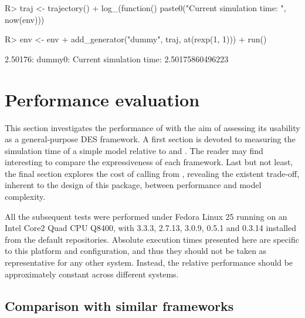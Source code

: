 \documentclass[
  nojss]{jss}
\begin{document}
\begin{CodeChunk}
\begin{CodeInput}
R> traj <- trajectory() %
+   log_(function() paste0("Current simulation time: ", now(env)))
\end{CodeInput}
\end{CodeChunk}

\begin{CodeChunk}
\begin{CodeInput}
R> env <- env %
+   add_generator("dummy", traj, at(rexp(1, 1))) %
+   run()
\end{CodeInput}
\begin{CodeOutput}
2.50176: dummy0: Current simulation time: 2.50175860496223
\end{CodeOutput}
\end{CodeChunk}

\hypertarget{performance-evaluation}{%
\section{Performance evaluation}\label{performance-evaluation}}

This section investigates the performance of  with the aim
of assessing its usability as a general-purpose DES framework. A first
section is devoted to measuring the simulation time of a simple model
relative to  and . The reader may find
interesting to compare the expressiveness of each framework. Last but
not least, the final section explores the cost of calling 
from , revealing the existent trade-off, inherent to the
design of this package, between performance and model complexity.

All the subsequent tests were performed under Fedora Linux 25 running on
an Intel Core2 Quad CPU Q8400, with  3.3.3,
 2.7.13,  3.0.9,  0.5.1 and
 0.3.14 installed from the default repositories. Absolute
execution times presented here are specific to this platform and
configuration, and thus they should not be taken as representative for
any other system. Instead, the relative performance should be
approximately constant across different systems.

\hypertarget{comparison-with-similar-frameworks}{%
\subsection{Comparison with similar
frameworks}\label{comparison-with-similar-frameworks}}
\end{document}
